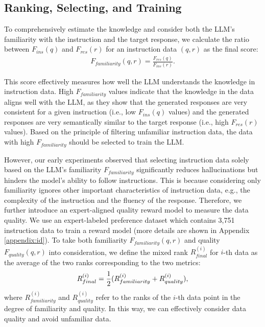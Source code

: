
\subsection{Ranking, Selecting, and Training}
To comprehensively estimate the knowledge and consider both the LLM’s familiarity with the instruction and the target response, we calculate the ratio between $F_{ins}(q)$ and $F_{res}(r)$ for an instruction data $(q,r)$ as the final score:
\begin{align}
F_{familiarity}(q,r) = \frac{F_{res}(q)}{F_{ins}(r)}.
\end{align}

This score effectively measures how well the LLM understands the knowledge in instruction data. 
High $F_{familiarity}$ values indicate that the knowledge in the data aligns well with the LLM, as they show that the generated responses are very consistent for a given instruction (i.e., low $F_{ins}(q)$ values) and the generated responses are very semantically similar to the target response (i.e., high $F_{res} (r)$ values).
Based on the principle of filtering unfamiliar instruction data, the data with high $F_{familiarity}$ should be selected to train the LLM.

However, our early experiments observed that selecting instruction data solely based on the LLM's familiarity $F_{familiarity}$ significantly reduces hallucinations but hinders the model's ability to follow instructions.
This is because considering only familiarity ignores other important characteristics of instruction data, e.g., the complexity of the instruction and the fluency of the response.
Therefore, we further introduce an expert-aligned quality reward model to measure the data quality.
We use an expert-labeled preference dataset \citep{DBLP:conf/icde/LiuTZZMZ0HZZMZY24} which contains 3,751 instruction data to train a reward model (more details are shown in Appendix \ref{appendix:id}).
To take both familiarity $F_{familiarity}(q,r)$ and quality $F_{quality}(q,r)$ into consideration, we define the mixed rank $R^{(i)}_{final}$ for $i$-th data as the average of the two ranks corresponding to the two metrics:
\begin{align}
\small
\label{eq:final_r}
R^{(i)}_{final} = \frac{1}{2}(R^{(i)}_{familiarity} + R^{(i)}_{quality}),
\end{align}
where $R^{(i)}_{familiarity}$ and $R^{(i)}_{quality}$ refer to the ranks of the $i$-th data point in the degree of familiarity and quality.
In this way, we can effectively consider data quality and avoid unfamiliar data.

